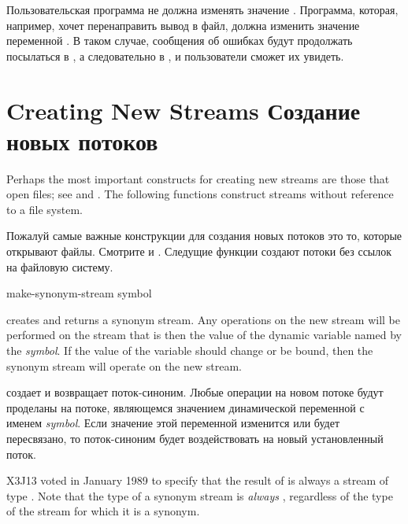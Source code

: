 Пользовательская программа не должна изменять значение
. Программа, которая, например, хочет перенаправить вывод в файл,
должна изменить значение переменной . В таком случае,
сообщения об ошибках будут продолжать посылаться в , а
следовательно в , и пользователи сможет их увидеть.

\section {Creating New Streams Создание новых потоков}

Perhaps the most important constructs for creating new streams
are those that open files; see  and .
The following functions construct streams without reference to a file system.

Пожалуй самые важные конструкции для создания новых потоков это то, которые
открывают файлы. Смотрите  и .
Следущие функции создают потоки без ссылок на файловую систему.

\begin{defun}[Function]
make-synonym-stream symbol

 creates and returns
a synonym stream.
Any operations on the new stream will be performed on the stream
that is then the value of the dynamic variable named by the \emph{symbol}.
If the value of the variable should change or be bound,
then the synonym stream will operate on the new stream.

 создает и возвращает поток-синоним.
Любые операции на новом потоке будут проделаны на потоке, являющемся значением
динамической переменной с именем \emph{symbol}.
Если значение этой переменной изменится или будет пересвязано, то поток-синоним
будет воздействовать на новый установленный поток.

\begin{new}
X3J13 voted in January 1989
to specify that the result of
 is always a stream of type .
Note that the type of a synonym stream is \emph{always} ,
regardless of the type of the stream for which it is a synonym.
\end{new}
\end{defun}

